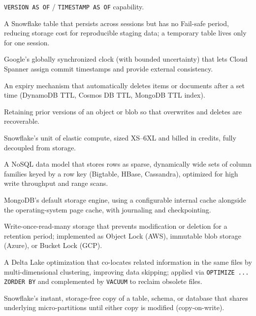 \begin{description}
    \texttt{VERSION AS OF} / \texttt{TIMESTAMP AS OF} capability.
  \item[Transient table] A Snowflake table that persists across sessions but has no Fail-safe period,
    reducing storage cost for reproducible staging data; a temporary table lives only for one session.
  \item[TrueTime] Google's globally synchronized clock (with bounded uncertainty) that lets Cloud
    Spanner assign commit timestamps and provide external consistency.
  \item[TTL (Time to Live)] An expiry mechanism that automatically deletes items or documents after a
    set time (DynamoDB TTL, Cosmos DB TTL, MongoDB TTL index).
  \item[Versioning] Retaining prior versions of an object or blob so that overwrites and deletes are
    recoverable.
  \item[Virtual warehouse] Snowflake's unit of elastic compute, sized XS--6XL and billed in credits,
    fully decoupled from storage.
  \item[Wide-column store] A NoSQL data model that stores rows as sparse, dynamically wide sets of
    column families keyed by a row key (Bigtable, HBase, Cassandra), optimized for high write
    throughput and range scans.
  \item[WiredTiger] MongoDB's default storage engine, using a configurable internal cache alongside the
    operating-system page cache, with journaling and checkpointing.
  \item[WORM] Write-once-read-many storage that prevents modification or deletion for a retention
    period; implemented as Object Lock (AWS), immutable blob storage (Azure), or Bucket Lock (GCP).
  \item[Z-ordering] A Delta Lake optimization that co-locates related information in the same files by
    multi-dimensional clustering, improving data skipping; applied via \texttt{OPTIMIZE ... ZORDER BY}
    and complemented by \texttt{VACUUM} to reclaim obsolete files.
  \item[Zero-copy clone] Snowflake's instant, storage-free copy of a table, schema, or database that
    shares underlying micro-partitions until either copy is modified (copy-on-write).
\end{description}
